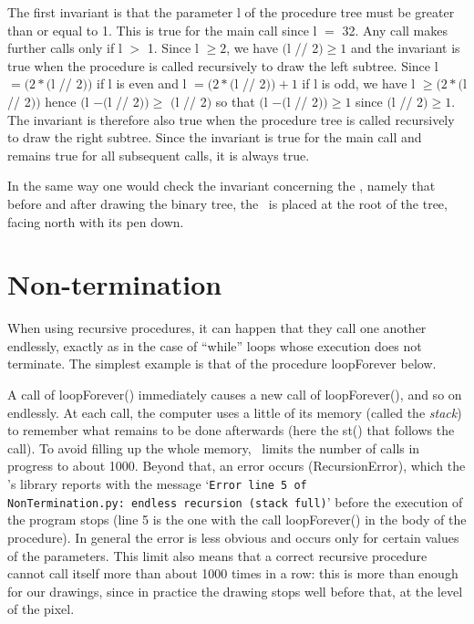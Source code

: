 The first invariant is that the parameter {\idt l} of the procedure {\idt tree} must be
greater than or equal to 1. This is
true for the main call since {\idt l} $=$ 32. Any call
makes further calls only if {\idt l} $>$ 1. Since
{\idt l} $\geq 2$, we have
$(${\idt l // 2}$) \geq 1$ and the invariant is true when the procedure is called recursively
to draw the left subtree. Since
{\idt l} $= (2 \ast (${\idt l // 2}$))$
if {\idt l} is even and
{\idt l} $= (2 \ast (${\idt l // 2}$)) + 1$
if {\idt l} is odd, we have
{\idt l} $\geq (2 \ast (${\idt l // 2}$))$ hence
$(${\idt l} $- (${\idt l // 2}$)) \geq$ $(${\idt l // 2}$)$ so that
$(${\idt l} $- (${\idt l // 2}$)) \geq 1$
since $(${\idt l // 2}$) \geq 1$. The invariant is therefore also true when the
procedure {\idt tree} is called recursively
to draw the right subtree. Since the invariant is true for the main call
and remains true for all subsequent calls, it is always true.

In the same way one would check the invariant concerning the \robot, namely that before and after
drawing the binary tree, the \robot\ is placed at the root of the tree, facing north with its
pen down.

\section{Non-termination}
When using recursive procedures, it can happen that they call one another
endlessly, exactly as in the case of ``while'' loops whose execution does not terminate. The
simplest example is that of the procedure {\idt loopForever} below.

\label{prog:NonTerminaison}

A call of {\idt loopForever()} immediately causes a new call of {\idt loop\-Forever()}, and so
on endlessly. At each call, the computer uses a little of its memory (called the
{\em stack}) to remember what remains to be done afterwards (here the {\idt st()} that follows
the call). To avoid filling up the whole memory, \python\ limits the number of calls
in progress to about 1000. Beyond that, an error occurs ({\idt RecursionError}), which the
\robot's library reports with the message
`{\tt Error line 5 of NonTermination.py:\ endless recursion (stack full)}'
before the execution of the program stops (line 5 is the one with the call {\idt loopForever()} in the
body of the procedure). In general
the error is less obvious and occurs only for certain values of the parameters.
This limit also means that a correct recursive procedure cannot call
itself more than about 1000 times in a row: this is more than enough for our drawings,
since in practice the drawing stops well before that, at the level of the pixel.

